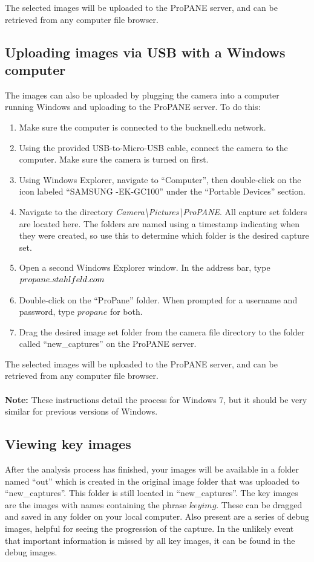 \documentclass[]{article}
\begin{document}
The selected images will be uploaded to the ProPANE server, and can be retrieved from any computer file browser.
		\subsection{Uploading images via USB with a Windows computer}
		The images can also be uploaded by plugging the camera into a computer running Windows and uploading to the ProPANE server.  To do this:
		\begin{enumerate}
		\item{Make sure the computer is connected to the bucknell.edu network.}
		\item{Using the provided USB-to-Micro-USB cable, connect the camera to the computer.  Make sure the camera is turned on first.}
		\item{Using Windows Explorer, navigate to ``Computer'', then double-click on the icon labeled ``SAMSUNG -EK-GC100'' under the ``Portable Devices'' section.}
		\item{Navigate to the directory \textit{Camera\textbackslash Pictures\textbackslash ProPANE}.  All capture set folders are located here.  The folders are named using a timestamp indicating when they were created, so use this to determine which folder is the desired capture set.}
		\item{Open a second Windows Explorer window.  In the address bar, type $\\propane.stahlfeld.com$}
		\item{Double-click on the ``ProPane'' folder.  When prompted for a username and password, type $propane$ for both.}
		\item{Drag the desired image set folder from the camera file directory to the folder called ``new\_captures'' on the ProPANE server.}
		\end{enumerate}
		
		The selected images will be uploaded to the ProPANE server, and can be retrieved from any computer file browser. \\ \\
		\textbf{Note:} These instructions detail the process for Windows 7, but it should be very similar for previous versions of Windows.
		
		\subsection{Viewing key images}	
		After the analysis process has finished, your images will be available in a folder named ``out'' which is created in the original image folder that was uploaded to ``new\_captures''.  This folder is still located in ``new\_captures''.  The key images are the images with names containing the phrase $keyimg$.  These can be dragged and saved in any folder on your local computer.  Also present are a series of debug images, helpful for seeing the progression of the capture.  In the unlikely event that important information is missed by all key images, it can be found in the debug images.  
		
\end{document}

